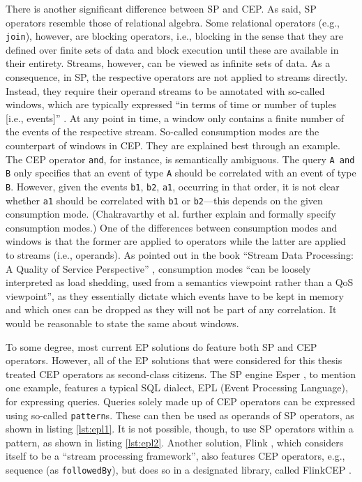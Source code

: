 \documentclass[article, 10pt, type=bsc, colorback, accentcolor=tud8b, parskip=half, bibliography=totocnumbered]{tudthesis}
\begin{document}
There is another significant difference between SP and CEP.
As said, SP operators resemble those of relational algebra.
Some relational operators (e.g., \lstinline{join}), however, are blocking operators, i.e., blocking in the sense that they are defined over finite sets of data and block execution until these are available in their entirety.
Streams, however, can be viewed as infinite sets of data.
As a consequence, in SP, the respective operators are not applied to streams directly.
Instead, they require their operand streams to be annotated with so-called windows, which are typically expressed ``in terms of time or number of tuples [i.e., events]'' \cite{Chakravarthy:2009:SDP:1550717}.
At any point in time, a window only contains a finite number of the events of the respective stream.
So-called consumption modes are the counterpart of windows in CEP.
They are explained best through an example.
The CEP operator \lstinline{and}, for instance, is semantically ambiguous.
The query \lstinline{A and B} only specifies that an event of type \lstinline{A} should be correlated with an event of type \lstinline{B}.
However, given the events \lstinline{b1}, \lstinline{b2}, \lstinline{a1}, occurring in that order, it is not clear whether \lstinline{a1} should be correlated with \lstinline{b1} or \lstinline{b2}---this depends on the given consumption mode.
(Chakravarthy et al. \cite{Chakravarthy:1994:CEA:645920.672994} further explain and formally specify consumption modes.)
One of the differences between consumption modes and windows is that the former are applied to operators while the latter are applied to streams (i.e., operands).
As pointed out in the book ``Stream Data Processing: A Quality of Service Perspective'' \cite{Chakravarthy:2009:SDP:1550717}, consumption modes ``can be loosely interpreted as load shedding, used from a semantics viewpoint rather than a QoS viewpoint'', as they essentially dictate which events have to be kept in memory and which ones can be dropped as they will not be part of any correlation.
It would be reasonable to state the same about windows.

To some degree, most current EP solutions do feature both SP and CEP operators.
However, all of the EP solutions that were considered for this thesis treated CEP operators as second-class citizens.
The SP engine Esper \cite{esper}, to mention one example, features a typical SQL dialect, EPL (Event Processing Language), for expressing queries.
Queries solely made up of CEP operators can be expressed using so-called \lstinline{pattern}s.
These can then be used as operands of SP operators, as shown in listing \ref{lst:epl1}.
It is not possible, though, to use SP operators within a pattern, as shown in listing \ref{lst:epl2}.
Another solution, Flink \cite{flink}, which considers itself to be a ``stream processing framework'', also features CEP operators, e.g., sequence (as \lstinline{followedBy}), but does so in a designated library, called FlinkCEP \cite{flinkcep}.
\end{document}
